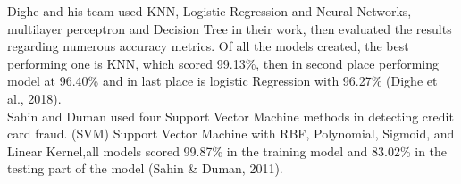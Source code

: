 Dighe and his team used KNN, Logistic Regression and Neural Networks, multilayer perceptron and Decision Tree in their work, then evaluated the results regarding numerous accuracy metrics. Of all the models created, the best performing one is KNN, which scored 99.13\%, then in second place performing model at 96.40\% and in last place is logistic Regression 
with 96.27\% (Dighe et al., 2018).\cite{8}\\


Sahin and Duman used four Support Vector Machine methods in detecting credit card fraud. (SVM) Support Vector Machine with RBF, Polynomial, Sigmoid, and Linear Kernel,all models scored 99.87\% in the training model and 83.02\% in the testing part of the model (Sahin & Duman, 2011).\cite{9}\\

